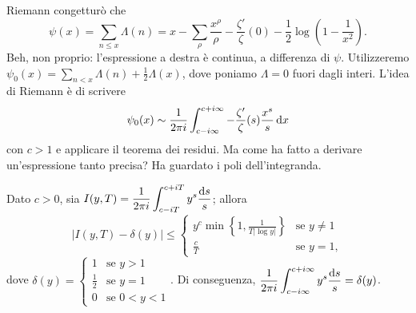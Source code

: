 Riemann congetturò che
$$\psi(x)=\sum_{n \le x} \Lambda(n)=x-\sum_{\rho} \frac{x^{\rho}}{\rho}-\frac{\zeta'}{\zeta}(0)-\frac{1}{2}\log\left(1-\frac{1}{x^2}\right).$$
Beh, non proprio: l'espressione a destra è continua, a differenza di $\psi$. Utilizzeremo $\psi_0(x)=\displaystyle \sum_{n<x} \Lambda(n)+\frac{1}{2}\Lambda(x)$, dove poniamo $\Lambda=0$ fuori dagli interi. L'idea di Riemann è di scrivere
$$\psi_0(x) \sim \frac{1}{2\pi i} \int_{c-i\infty}^{c+i\infty} -\frac{\zeta'}{\zeta}(s)\frac{x^s}{s}\mathop{}\!\mathrm{d} x$$
con $c>1$ e applicare il teorema dei residui. Ma come ha fatto a derivare un'espressione tanto precisa? Ha guardato i poli dell'integranda.

\begin{lm}
  Dato $c>0$, sia $I(y,T)=\displaystyle \frac{1}{2\pi i}\int_{c-iT}^{c+iT} y^s\frac{\mathop{}\!\mathrm{d} s}{s}$; allora
  $$|I(y,T)-\delta(y)| \le \begin{cases}
    y^c\min\left\{1,\frac{1}{T|\log{y}|}\right\} & \mbox{se } y\not=1 \\
    \frac{c}{T} & \mbox{se } y=1,
\end{cases}$$
dove $\delta(y)=\begin{cases}
  1 & \mbox{se } y>1 \\
  \frac{1}{2} & \mbox{se } y=1 \\
  0 & \mbox{se } 0<y<1
\end{cases}$. Di conseguenza, $\displaystyle \frac{1}{2\pi i}\int_{c-i\infty}^{c+i\infty} y^s\frac{\mathop{}\!\mathrm{d} s}{s}=\delta(y)$.
\end{lm}

